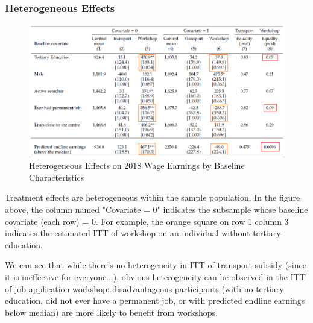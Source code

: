         \subsubsection{Heterogeneous Effects}
            \begin{figure}[H]
                \centering
                \includegraphics[width=5.5in]{images/ch6/Abebe result 6 heterogeneous.png}
                \caption{Heterogeneous Effects on 2018 Wage Earnings by Baseline Characteristics}
            \end{figure}
            Treatment effects are heterogeneous within the sample population. In the figure above, the column named "Covariate = 0" indicates the subsample whose baseline covariate (each row) = 0. For example, the orange square on row 1 column 3 indicates the estimated ITT of workshop on an individual without tertiary education.\par
            We can see that while there's no heterogeneity in ITT of transport subsidy (since it is ineffective for everyone...), obvious heterogeneity can be observed in the ITT of job application workshop: disadvantageous participants (with no tertiary education, did not ever have a permanent job, or with predicted endline earnings below median) are more likely to benefit from workshops.
            